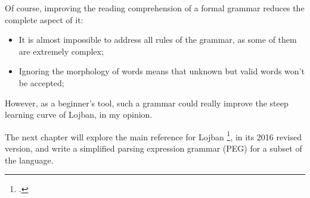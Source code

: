 Of course, improving the reading comprehension of a formal grammar reduces the complete aspect of it:

\begin{itemize}
  \item It is almost impossible to address all rules of the grammar, as some of them are extremely complex;
  \item Ignoring the morphology of words means that unknown but valid words won't be accepted;
\end{itemize}

However, as a beginner's tool, such a grammar could really improve the steep learning curve of Lojban, in my opinion.\newline

The next chapter will explore the main reference for Lojban \footcite{cowan1997complete}, in its 2016 revised version,
and write a simplified parsing expression grammar (PEG) for a subset of the language.